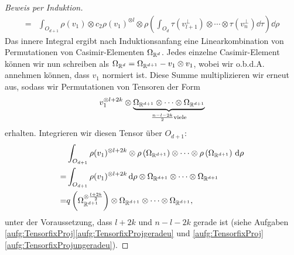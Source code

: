 \begin{proof}[Beweis per Induktion]
\begin{align*}
	= &\int_{O_{d+1}} \rho(v_1) \otimes c_2 \rho(v_1)^{\otimes l}\otimes \rho\left(\int_{O_{d}}\tau(v_{l+1}^\perp) \otimes \cdots \otimes \tau(v_n^\perp) \dd \tau \right) \dd \rho
\end{align*}
Das innere Integral ergibt nach Induktionsanfang eine Linearkombination von Permutationen von Casimir-Elementen $\Omega_{\mathbb{R}^d}$. Jedes einzelne Casimir-Element können wir nun schreiben als $\Omega_{\mathbb{R}^d} = \Omega_{\mathbb{R}^{d+1}} - v_1 \otimes v_1$, wobei wir o.b.d.A. annehmen können, dass $v_1$ normiert ist. Diese Summe multiplizieren wir erneut aus, sodass wir Permutationen von Tensoren der Form
\begin{align*}
	v_1^{\otimes l+2k} \otimes \underbrace{\Omega_{\mathbb{R}^{d+1}} \otimes \cdots \otimes \Omega_{\mathbb{R}^{d+1}}}_{\frac{n-l-2k}{2} \text{viele}}
\end{align*}
erhalten. Integrieren wir diesen Tensor über $O_{d+1}$: 
\begin{align*}
	&\int_{O_{d+1}} \rho(v_1)^{\otimes l+2k} \otimes \rho\left(\Omega_{\mathbb{R}^{d+1}}\right) \otimes \cdots \otimes \rho\left(\Omega_{\mathbb{R}^{d+1}}\right)\,\textrm{d} \rho \\
	=& \int_{O_{d+1}} \rho(v_1)^{\otimes l+2k} \,\textrm{d} \rho \otimes \Omega_{\mathbb{R}^{d+1}} \otimes \cdots \otimes \Omega_{\mathbb{R}^{d+1}}\\
	=& q\left(\Omega_{\mathbb{R}^{d+1}}^{\otimes \frac{ l+2k}{2}}\right) \otimes \Omega_{\mathbb{R}^{d+1}} \otimes \cdots \otimes \Omega_{\mathbb{R}^{d+1}},
\end{align*}
unter der Voraussetzung, dass $l+2k$ und $n-l-2k$ gerade ist (siehe Aufgaben \ref{aufg:TensorfixProj}\ref{aufg:TensorfixProjgeradeu} und \ref{aufg:TensorfixProj}\ref{aufg:TensorfixProjungeradeu}).
\end{proof}

